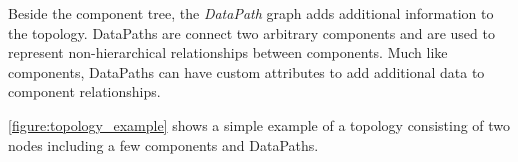 Beside the component tree, the \emph{DataPath} graph adds additional information to the topology.
DataPaths are connect two arbitrary components and are used to represent non-hierarchical relationships between components.
Much like components, DataPaths can have custom attributes to add additional data to component relationships. \cite{sys_concept}

\autoref{figure:topology_example} shows a simple example of a topology consisting of two nodes including a few components and DataPaths.